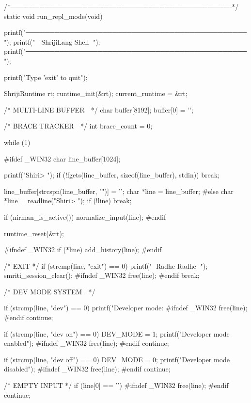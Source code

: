 \documentclass{article}
\begin{document}
/*──────────────────────────────────────────────*/
static void run_repl_mode(void)
{
    printf("──────────────────────────────────────────────\n");
    printf("        🌸 ShrijiLang Shell 🌸\n");
    printf("──────────────────────────────────────────────\n");

    printf("Type 'exit' to quit\n\n");

    ShrijiRuntime rt;
    runtime_init(&rt);
    current_runtime = &rt;

    /* MULTI-LINE BUFFER 🌸 */
    char buffer[8192];
    buffer[0] = '\0';

    /* BRACE TRACKER 🌸 */
    int brace_count = 0;

    while (1)
    {
#ifdef _WIN32
        char line_buffer[1024];

        printf("Shiri> ");
        if (!fgets(line_buffer, sizeof(line_buffer), stdin))
            break;

        line_buffer[strcspn(line_buffer, "\n")] = '\0';
        char *line = line_buffer;
#else
        char *line = readline("Shiri> ");
        if (!line) break;

        if (nirman_is_active())
            normalize_input(line);
#endif

        runtime_reset(&rt);

#ifndef _WIN32
        if (*line) add_history(line);
#endif

        /* EXIT */
        if (strcmp(line, "exit") == 0)
        {
            printf("🌸 Radhe Radhe 🌸\n");
            smriti_session_clear();
#ifndef _WIN32
            free(line);
#endif
            break;
        }

        /* DEV MODE SYSTEM 🌸 */

        if (strcmp(line, "dev") == 0)
        {
            printf("Developer mode: %
#ifndef _WIN32
            free(line);
#endif
            continue;
        }

        if (strcmp(line, "dev on") == 0)
        {
            DEV_MODE = 1;
            printf("Developer mode enabled\n");
#ifndef _WIN32
            free(line);
#endif
            continue;
        }

        if (strcmp(line, "dev off") == 0)
        {
            DEV_MODE = 0;
            printf("Developer mode disabled\n");
#ifndef _WIN32
            free(line);
#endif
            continue;
        }

        /* EMPTY INPUT */
        if (line[0] == '\0')
        {
#ifndef _WIN32
            free(line);
#endif
            continue;
        }

}}
\end{document}
